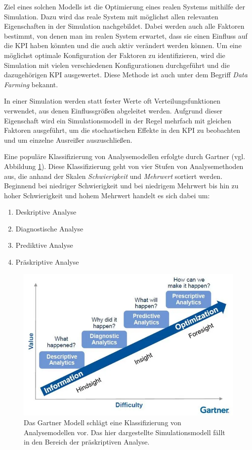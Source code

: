 \documentclass[11pt,a4paper]{article}
\begin{document}
Ziel eines solchen Modells ist die Optimierung eines realen Systems mithilfe der Simulation.
Dazu wird das reale System mit möglichst allen relevanten Eigenschaften in der Simulation nachgebildet.
Dabei werden auch alle Faktoren bestimmt, von denen man im realen System erwartet, dass sie einen Einfluss auf die KPI
haben könnten und die auch aktiv verändert werden können.
Um eine möglichst optimale Konfiguration der Faktoren zu identifizieren, wird die Simulation 
mit vielen verschiedenen Konfigurationen durchgeführt und die dazugehörigen KPI ausgewertet.
Diese Methode ist auch unter dem Begriff \emph{Data Farming} bekannt. %

In einer Simulation werden statt fester Werte oft Verteilungsfunktionen verwendet, aus denen Einflussgrößen abgeleitet werden. 
Aufgrund dieser Eigenschaft wird ein Simulationsmodell in der Regel mehrfach
mit gleichen Faktoren ausgeführt, um die stochastischen Effekte in den KPI zu beobachten und
um einzelne Ausreißer auszuschließen. 

Eine populäre Klassifizierung von Analysemodellen erfolgte durch Gartner \cite{Gartner} (vgl. Abbildung \ref{fig:gartner-modell}).
Diese Klassifizierung geht von vier Stufen von Analysemethoden aus, die anhand der Skalen \emph{Schwierigkeit} und \emph{Mehrwert} sortiert werden.
Beginnend bei niedriger Schwierigkeit und bei niedrigem Mehrwert bis hin zu hoher Schwierigkeit und hohem Mehrwert
handelt es sich dabei um:
\begin{enumerate}
	\item Deskriptive Analyse
	\item Diagnostische Analyse
	\item Prediktive Analyse
	\item Präskriptive Analyse
\end{enumerate}

\begin{figure}
	\label{fig:gartner-modell}
	\centering
	\includegraphics[width=\textwidth]{media/analytic-maturity.png}
	\caption{
		Das Gartner Modell schlägt eine Klassifizierung von Analysemodellen vor.
		Das hier dargestellte Simulationsmodell fällt in den Bereich der 
		präskriptiven Analyse. 
	}
\end{figure}
\end{document}
